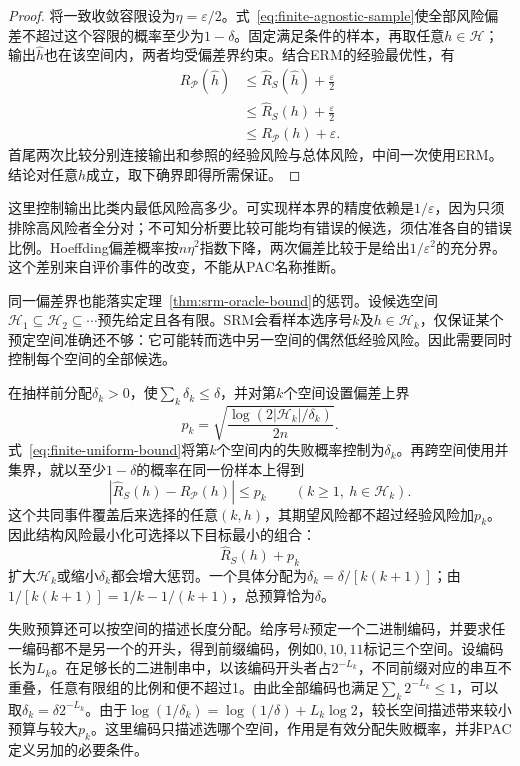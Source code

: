 \begin{proof}
将一致收敛容限设为$\eta=\varepsilon/2$。式~\eqref{eq:finite-agnostic-sample}使全部风险偏差不超过这个容限的概率至少为$1-\delta$。固定满足条件的样本，再取任意$h\in\mathcal H$；输出$\hat h$也在该空间内，两者均受偏差界约束。结合ERM的经验最优性，有
\begin{align*}
 R_{\mathcal P}(\hat h)
 &\leq\hat R_S(\hat h)+\frac{\varepsilon}{2}\\
 &\leq\hat R_S(h)+\frac{\varepsilon}{2}\\
 &\leq R_{\mathcal P}(h)+\varepsilon.
\end{align*}
首尾两次比较分别连接输出和参照的经验风险与总体风险，中间一次使用ERM。结论对任意$h$成立，取下确界即得所需保证。
\end{proof}

这里控制输出比类内最低风险高多少。可实现样本界的精度依赖是$1/\varepsilon$，因为只须排除高风险者全分对；不可知分析要比较可能均有错误的候选，须估准各自的错误比例。Hoeffding偏差概率按$n\eta^2$指数下降，两次偏差比较于是给出$1/\varepsilon^2$的充分界。这个差别来自评价事件的改变，不能从PAC名称推断。

同一偏差界也能落实定理~\ref{thm:srm-oracle-bound}的惩罚。设候选空间$\mathcal H_1\subseteq\mathcal H_2\subseteq\cdots$预先给定且各有限。SRM会看样本选序号$k$及$h\in\mathcal H_k$，仅保证某个预定空间准确还不够：它可能转而选中另一空间的偶然低经验风险。因此需要同时控制每个空间的全部候选。

在抽样前分配$\delta_k>0$，使$\sum_k\delta_k\leq\delta$，并对第$k$个空间设置偏差上界
\[
 p_k=\sqrt{\frac{\log(2|\mathcal H_k|/\delta_k)}{2n}}.
\]
式~\eqref{eq:finite-uniform-bound}将第$k$个空间内的失败概率控制为$\delta_k$。再跨空间使用并集界，就以至少$1-\delta$的概率在同一份样本上得到
\[
 |\hat R_S(h)-R_{\mathcal P}(h)|\leq p_k
 \qquad(k\geq1,\ h\in\mathcal H_k).
\]
这个共同事件覆盖后来选择的任意$(k,h)$，其期望风险都不超过经验风险加$p_k$。因此结构风险最小化可选择以下目标最小的组合：
\begin{equation}
 \hat R_S(h)+p_k
 \label{eq:srm-finite-penalty}
\end{equation}
扩大$\mathcal H_k$或缩小$\delta_k$都会增大惩罚。一个具体分配为$\delta_k=\delta/[k(k+1)]$；由$1/[k(k+1)]=1/k-1/(k+1)$，总预算恰为$\delta$。

失败预算还可以按空间的描述长度分配。给序号$k$预定一个二进制编码，并要求任一编码都不是另一个的开头，得到前缀编码，例如$0,10,11$标记三个空间。设编码长为$L_k$。在足够长的二进制串中，以该编码开头者占$2^{-L_k}$，不同前缀对应的串互不重叠，任意有限组的比例和便不超过1。由此全部编码也满足$\sum_k2^{-L_k}\leq1$，可以取$\delta_k=\delta2^{-L_k}$。由于$\log(1/\delta_k)=\log(1/\delta)+L_k\log2$，较长空间描述带来较小预算与较大$p_k$。这里编码只描述选哪个空间，作用是有效分配失败概率，并非PAC定义另加的必要条件。

